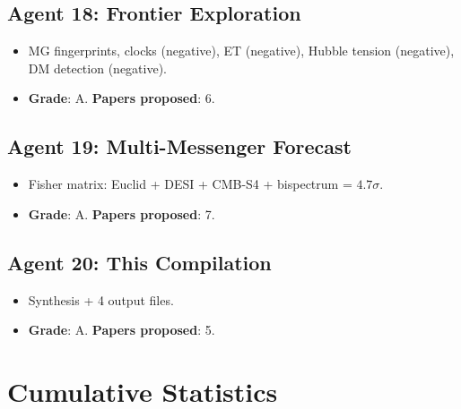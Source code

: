 \documentclass[11pt,a4paper]{article}
\begin{document}
\subsection{Agent 18: Frontier Exploration}
\begin{itemize}[nosep]
\item MG fingerprints, clocks (negative), ET (negative), Hubble tension (negative), DM detection (negative).
\item \textbf{Grade}: A. \textbf{Papers proposed}: 6.
\end{itemize}

\subsection{Agent 19: Multi-Messenger Forecast}
\begin{itemize}[nosep]
\item Fisher matrix: Euclid + DESI + CMB-S4 + bispectrum = $4.7\sigma$.
\item \textbf{Grade}: A. \textbf{Papers proposed}: 7.
\end{itemize}

\subsection{Agent 20: This Compilation}
\begin{itemize}[nosep]
\item Synthesis + 4 output files.
\item \textbf{Grade}: A. \textbf{Papers proposed}: 5.
\end{itemize}

\section{Cumulative Statistics}
\end{document}
